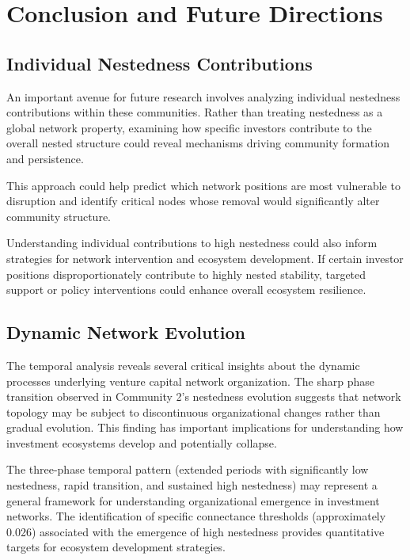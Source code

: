 \section{Conclusion and Future Directions}

\subsection{Individual Nestedness Contributions}

An important avenue for future research involves analyzing individual nestedness contributions within these communities. Rather than treating nestedness as a global network property, examining how specific investors contribute to the overall nested structure could reveal mechanisms driving community formation and persistence. 

This approach could help predict which network positions are most vulnerable to disruption and identify critical nodes whose removal would significantly alter community structure.

Understanding individual contributions to high nestedness could also inform strategies for network intervention and ecosystem development. If certain investor positions disproportionately contribute to highly nested stability, targeted support or policy interventions could enhance overall ecosystem resilience.

\subsection{Dynamic Network Evolution}

The temporal analysis reveals several critical insights about the dynamic processes underlying venture capital network organization. The sharp phase transition observed in Community 2's nestedness evolution suggests that network topology may be subject to discontinuous organizational changes rather than gradual evolution. This finding has important implications for understanding how investment ecosystems develop and potentially collapse.

The three-phase temporal pattern (extended periods with significantly low nestedness, rapid transition, and sustained high nestedness) may represent a general framework for understanding organizational emergence in investment networks. The identification of specific connectance thresholds (approximately 0.026) associated with the emergence of high nestedness provides quantitative targets for ecosystem development strategies. 


